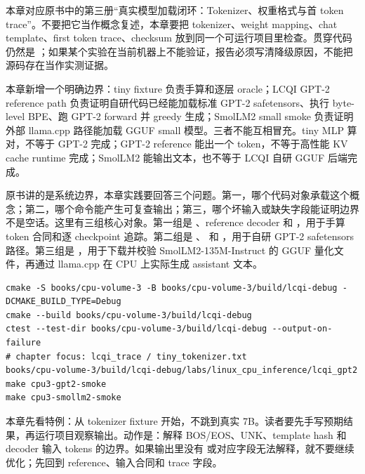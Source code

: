 
本章对应原书中的第三册“真实模型加载闭环：Tokenizer、权重格式与首 token trace”。不要把它当作概念复述，本章要把 tokenizer、weight mapping、chat template、first token trace、checksum 放到同一个可运行项目里检查。贯穿代码仍然是 ；如果某个实验在当前机器上不能验证，报告必须写清降级原因，不能把源码存在当作实测证据。

本章新增一个明确边界：tiny fixture 负责手算和逐层 oracle；LCQI GPT-2 reference path 负责证明自研代码已经能加载标准 GPT-2 safetensors、执行 byte-level BPE、跑 GPT-2 forward 并 greedy 生成；SmolLM2 small smoke 负责证明外部 llama.cpp 路径能加载 GGUF small 模型。三者不能互相冒充。tiny MLP 算对，不等于 GPT-2 完成；GPT-2 reference 能出一个 token，不等于高性能 KV cache runtime 完成；SmolLM2 能输出文本，也不等于 LCQI 自研 GGUF 后端完成。


原书讲的是系统边界，本章实践要回答三个问题。第一，哪个代码对象承载这个概念；第二，哪个命令能产生可复查输出；第三，哪个坏输入或缺失字段能证明边界不是空话。这里有三组核心对象。第一组是 、reference decoder 和 ，用于手算 token 合同和逐 checkpoint 追踪。第二组是 、 和 ，用于自研 GPT-2 safetensors 路径。第三组是 ，用于下载并校验 SmolLM2-135M-Instruct 的 GGUF 量化文件，再通过 llama.cpp 在 CPU 上实际生成 assistant 文本。

\begin{lstlisting}[numbers=none,caption={第 10 章实践：真实模型加载闭环与首 Token Trace 的最小命令入口}]
cmake -S books/cpu-volume-3 -B books/cpu-volume-3/build/lcqi-debug -DCMAKE_BUILD_TYPE=Debug
cmake --build books/cpu-volume-3/build/lcqi-debug
ctest --test-dir books/cpu-volume-3/build/lcqi-debug --output-on-failure
# chapter focus: lcqi_trace / tiny_tokenizer.txt
books/cpu-volume-3/build/lcqi-debug/labs/linux_cpu_inference/lcqi_gpt2
make cpu3-gpt2-smoke
make cpu3-smollm2-smoke
\end{lstlisting}


本章先看特例：从 tokenizer fixture 开始，不跳到真实 7B。读者要先手写预期结果，再运行项目观察输出。动作是：解释 BOS/EOS、UNK、template hash 和 decoder 输入 tokens 的边界。如果输出里没有  或对应字段无法解释，就不要继续优化；先回到 reference、输入合同和 trace 字段。


